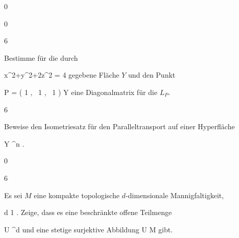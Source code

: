 {0}
{

}
{} {}

{0}
{

}
{} {}

{6}
{

Bestimme für die durch

\mavergleichskettedisp
{\vergleichskette
{ x^2+y^2+2z^2
}
{ =} { 4
}
{ } {
}
{ } {
}
{ } {
}
}
{}{}{}
gegebene Fläche $Y$ und den Punkt

\mavergleichskettedisp
{\vergleichskette
{ P
}
{ =} { \left(  1  , \,   1  , \,   1                 \right)
}
{ \in} { Y
}
{ } {
}
{ } {
}
}
{}{}{}
eine Diagonalmatrix für die
$L_P$.

}
{} {}

{6}
{

Beweise den Isometriesatz für den Paralleltransport auf einer Hyperfläche

\mavergleichskette
{\vergleichskette
{ Y
}
{ \subseteq }{ \R^n
}
{  }{
}
{    }{
}
{   }{
}
}
{}{}{.}

}
{} {}

{0}
{

}
{} {}

{6}
{

Es sei $M$ eine kompakte topologische $d$-dimensionale Mannigfaltigkeit,

\mavergleichskette
{\vergleichskette
{ d
}
{ \geq }{ 1
}
{  }{
}
{    }{
}
{   }{
}
}
{}{}{.}
Zeige, dass es eine beschränkte offene Teilmenge

\mavergleichskette
{\vergleichskette
{ U
}
{ \subseteq }{ \R^d
}
{  }{
}
{    }{
}
{   }{
}
}
{}{}{}
und eine stetige surjektive Abbildung
\maabbdisp {\varphi} { U } { M
} {}
gibt.

}
{} {}

